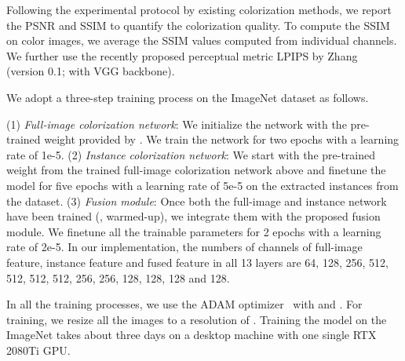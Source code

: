 Following the experimental protocol by existing colorization methods, we report the PSNR and SSIM to quantify the colorization quality.
To compute the SSIM on color images, we average the SSIM values computed from individual channels.
We further use the recently proposed perceptual metric LPIPS by Zhang~\etal~\cite{zhang-CVPR-2018} (version 0.1; with VGG backbone).

We adopt a three-step training process on the ImageNet dataset as follows.

(1) \emph{Full-image colorization network}: We initialize the network with the pre-trained weight provided by \cite{Zhang-SIGGRAPH-2017}. We train the network for two epochs with a learning rate of 1e-5. 
(2) \emph{Instance colorization network}: We start with the pre-trained weight from the trained full-image colorization network above and finetune the model for five epochs with a learning rate of 5e-5 on the extracted instances from the dataset. 
(3) \emph{Fusion module}: Once both the full-image and instance network have been trained (\ie, warmed-up), we integrate them with the proposed fusion module. 
We finetune all the trainable parameters for 2 epochs with a learning rate of 2e-5. 
In our implementation, the numbers of channels of full-image feature, instance feature and fused feature in all 13 layers are 64, 128, 256, 512, 512, 512, 512, 256, 256, 128, 128, 128 and 128.

In all the training processes, we use the ADAM optimizer~\cite{kingma2014adam} with  and . 
For training, we resize all the images to a resolution of . 
Training the model on the ImageNet takes about three days on a desktop machine with one single RTX 2080Ti GPU.


